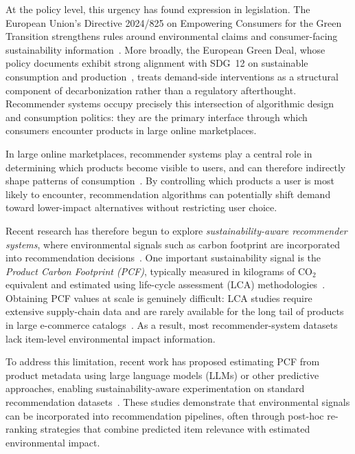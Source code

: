 \documentclass[11pt]{article}
\begin{document}
At the policy level, this urgency has found expression in legislation. The European Union's
Directive 2024/825 on Empowering Consumers for the Green Transition strengthens rules around
environmental claims and consumer-facing sustainability information~\cite{eu2024825}. More broadly, the European
Green Deal, whose policy documents exhibit strong alignment with SDG~12 on sustainable
consumption and production~\cite{koundouri2024greendeal}, treats demand-side interventions
as a structural component of decarbonization rather than a regulatory afterthought.
Recommender systems occupy precisely this intersection of algorithmic design and consumption
politics: they are the primary interface through which consumers encounter products in large
online marketplaces.

In large online marketplaces, recommender systems play a central role in determining which
products become visible to users, and can therefore indirectly shape patterns of
consumption~\cite{jesse2021digitalnudging, halimeh2026nudging}. By controlling which
products a user is most likely to encounter, recommendation algorithms can potentially shift
demand toward lower-impact alternatives without restricting user choice.

Recent research has therefore begun to explore \emph{sustainability-aware recommender
systems}, where environmental signals such as carbon footprint are incorporated into
recommendation decisions~\cite{kalisvaart2025greenerrec, spillo2023sustainabilityaware,
ecoa2026, vicenti2026pcfllm}. One important sustainability signal is the \emph{Product
Carbon Footprint (PCF)}, typically measured in kilograms of CO$_2$ equivalent and estimated
using life-cycle assessment (LCA) methodologies~\cite{meinrenken2022carboncatalogue}.
Obtaining PCF values at scale is genuinely difficult: LCA studies require extensive
supply-chain data and are rarely available for the long tail of products in large
e-commerce catalogs~\cite{meinrenken2022carboncatalogue}. As a result, most
recommender-system datasets lack item-level environmental impact information.

To address this limitation, recent work has proposed estimating PCF from product metadata
using large language models (LLMs) or other predictive approaches, enabling
sustainability-aware experimentation on standard recommendation
datasets~\cite{vicenti2026pcfllm, ecoa2026}. These studies demonstrate that environmental
signals can be incorporated into recommendation pipelines, often through post-hoc
re-ranking strategies that combine predicted item relevance with estimated environmental
impact.
\end{document}
